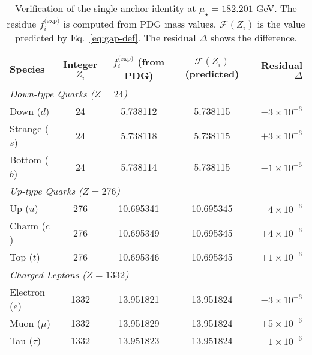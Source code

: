 \documentclass[aps,prd,onecolumn,amsmath,amssymb,superscriptaddress,nofootinbib,showpacs,showkeys]{revtex4-2}
\begin{document}
\begin{table}[h!]
    \centering
\caption{Verification of the single-anchor identity at \texorpdfstring{$\mu_\star = 182.201$}{mu*=182.201} GeV. The residue \texorpdfstring{$f_i^{\text{(exp)}}$}{f_i(exp)} is computed from PDG mass values. \texorpdfstring{$\mathcal{F}(Z_i)$}{F(Zi)} is the value predicted by Eq.~\ref{eq:gap-def}. The residual \texorpdfstring{$\Delta$}{Delta} shows the difference.}
    \label{tab:results-a}
    \begin{tabular}{l c c c r}
       \toprule
        \textbf{Species} & \textbf{Integer $Z_i$} & \textbf{$f_i^{\text{(exp)}}$ (from PDG)} & \textbf{$\mathcal{F}(Z_i)$ (predicted)} & \textbf{Residual $\Delta$} \\
        \midrule
        \multicolumn{5}{l}{\textit{Down-type Quarks ($Z=24$)}} \\
        Down ($d$)   & 24 & 5.738112 & 5.738115 & $-3 \times 10^{-6}$ \\
        Strange ($s$) & 24 & 5.738118 & 5.738115 & $+3 \times 10^{-6}$ \\
        Bottom ($b$) & 24 & 5.738114 & 5.738115 & $-1 \times 10^{-6}$ \\
        \midrule
        \multicolumn{5}{l}{\textit{Up-type Quarks ($Z=276$)}} \\
        Up ($u$)     & 276 & 10.695341 & 10.695345 & $-4 \times 10^{-6}$ \\
        Charm ($c$)  & 276 & 10.695349 & 10.695345 & $+4 \times 10^{-6}$ \\
        Top ($t$)    & 276 & 10.695346 & 10.695345 & $+1 \times 10^{-6}$ \\
        \midrule
        \multicolumn{5}{l}{\textit{Charged Leptons ($Z=1332$)}} \\
        Electron ($e$) & 1332 & 13.951821 & 13.951824 & $-3 \times 10^{-6}$ \\
        Muon ($\mu$)     & 1332 & 13.951829 & 13.951824 & $+5 \times 10^{-6}$ \\
        Tau ($\tau$)     & 1332 & 13.951823 & 13.951824 & $-1 \times 10^{-6}$ \\
        \bottomrule
    \end{tabular}
\end{table}
\end{document}
